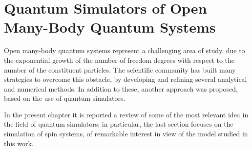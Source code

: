 
\chapter{Quantum Simulators of Open Many-Body Quantum Systems}
\epigraph{}{\textit{}}

Open many-body quantum systems represent a challenging area of study, due to the exponential growth of the number of freedom degrees with respect to the number of the constituent particles. The scientific community has built many strategies to overcome this obstacle, by developing and refining several analytical and numerical methods. In addition to these, another approach was proposed, based on the use of quantum simulators.

In the present chapter it is reported a review of some of the most relevant idea in the field of quantum simulators; in particular, the last section focuses on the simulation of spin systems, of remarkable interest in view of the model studied in this work.

